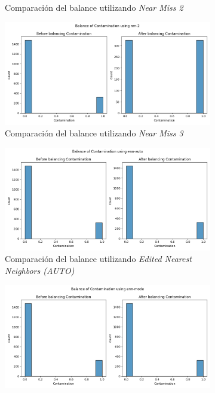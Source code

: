 \begin{figure}[!ht]
\begin{subfigure}[b]{0.5\textwidth}
        \caption{Comparación del balance utilizando \textit{Near Miss 2}}
    \end{subfigure}%
    \begin{subfigure}[b]{0.5\textwidth}
        \centering
        \includegraphics[width=\textwidth]{media/images/under-sampling/nm-2.png}
        \caption{Comparación del balance utilizando \textit{Near Miss 3}}
    \end{subfigure}
    \begin{subfigure}[b]{0.5\textwidth}
        \centering
        \includegraphics[width=\textwidth]{media/images/under-sampling/enn-auto.png}
        \caption{Comparación del balance utilizando \textit{Edited Nearest Neighbors (AUTO)}}
    \end{subfigure}%
    \begin{subfigure}[b]{0.5\textwidth}
        \centering
        \includegraphics[width=\textwidth]{media/images/under-sampling/enn-mode.png}

\end{subfigure}
\end{figure}
